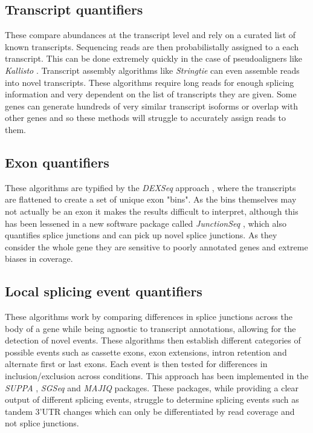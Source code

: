 \subsection{Transcript quantifiers}
These compare abundances at the transcript level and rely on a curated list of known transcripts. Sequencing reads are then probabilistally assigned to a each transcript. This can be done extremely quickly in the case of pseudoaligners like \textit{Kallisto} \citep{Bray2015}. Transcript assembly algorithms like \textit{Stringtie} \citep{Pertea2015} can even assemble reads into novel transcripts. These algorithms require long reads for enough splicing information and very dependent on the list of transcripts they are given. Some genes can generate hundreds of very similar transcript isoforms or overlap with other genes and so these methods will struggle to accurately assign reads to them.

\subsection{Exon quantifiers}
These algorithms are typified by the \textit{DEXSeq} approach \citep{Anders2012}, where the transcripts are flattened to create a set of unique exon "bins".  As the bins themselves may not actually be an exon it makes the results difficult to interpret, although this has been lessened in a new software package called \textit{JunctionSeq} \citep{Hartley2015}, which also quantifies splice junctions and can pick up novel splice junctions. As they consider the whole gene they are sensitive to poorly annotated genes and extreme biases in coverage.

\subsection{Local splicing event quantifiers}
These algorithms work by comparing differences in splice junctions across the body of a gene while being agnostic to transcript annotations, allowing for the detection of novel events. These algorithms then establish different categories of possible events such as cassette exons, exon extensions, intron retention and alternate first or last exons. Each event is then tested for differences in inclusion/exclusion across conditions. This approach has been implemented in the \textit{SUPPA} \citep{Alamancos2015}, \textit{SGSeq} \citep{Goldstein2016} and \textit{MAJIQ} \citep{Vaquero-Garcia2016} packages. These packages, while providing a clear output of different splicing events, struggle to determine splicing events such as tandem 3'UTR changes which can only be differentiated by read coverage and not splice junctions. 

